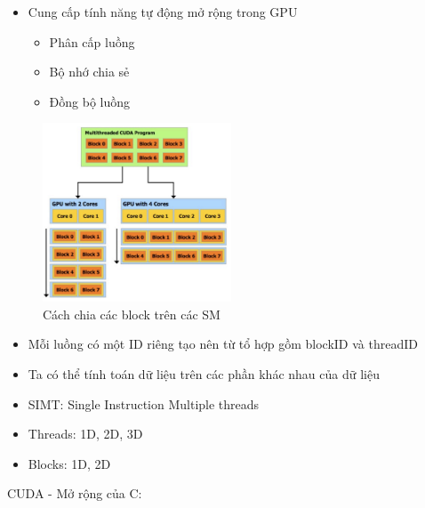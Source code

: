 \documentclass[14pt, a4paper]{article}
\numberwithin{equation}{section}
\numberwithin{figure}{section}
\numberwithin{dl}{section}
\numberwithin{md}{section}
\numberwithin{bd}{section}
\numberwithin{dn}{section}
\numberwithin{hq}{section}
\begin{document}
\begin{itemize}
    \item Cung cấp tính năng tự động mở rộng trong GPU
    \begin{itemize}
        \item Phân cấp luồng
        \item Bộ nhớ chia sẻ
        \item Đồng bộ luồng
    \end{itemize}
\end{itemize}

\begin{figure}[H]
    \centering
    \includegraphics[width=0.5\textwidth]{figures/CUDA/Multithread_SM.png}
    \caption{Cách chia các block trên các SM}
\end{figure}

\begin{itemize}
    \item Mỗi luồng có một ID riêng tạo nên từ tổ hợp gồm blockID và threadID
    \item Ta có thể tính toán dữ liệu trên các phần khác nhau của dữ liệu
    \item SIMT: Single Instruction Multiple threads
    \item Threads: 1D, 2D, 3D
    \item Blocks: 1D, 2D
\end{itemize}

CUDA - Mở rộng của C:
\end{document}
